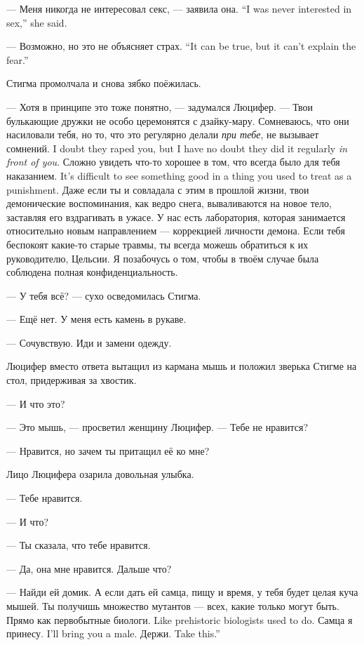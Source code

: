 {--- Меня никогда не интересовал секс, --- заявила она.}
{``I was never interested in sex,'' she said.}

{--- Возможно, но это не объясняет страх.}
{``It can be true, but it can't explain the fear.''}

Стигма промолчала и снова зябко поёжилась.

--- Хотя в принципе это тоже понятно, --- задумался Люцифер.
--- Твои булькающие дружки не особо церемонятся с дзайку-мару.
{Сомневаюсь, что они насиловали тебя, но то, что это регулярно делали \emph{при тебе}, не вызывает сомнений.}
{I doubt they raped you, but I have no doubt they did it regularly \emph{in front of you}.}
{Сложно увидеть что-то хорошее в том, что всегда было для тебя наказанием.}
{It's difficult to see something good in a thing you used to treat as a punishment.}
Даже если ты и совладала с этим в прошлой жизни, твои демонические воспоминания, как ведро снега, вываливаются на новое тело, заставляя его вздрагивать в ужасе.
У нас есть лаборатория, которая занимается относительно новым направлением --- коррекцией личности демона.
Если тебя беспокоят какие-то старые травмы, ты всегда можешь обратиться к их руководителю, Цельсии.
Я позабочусь о том, чтобы в твоём случае была соблюдена полная конфиденциальность.

--- У тебя всё? --- сухо осведомилась Стигма.

--- Ещё нет.
У меня есть камень в рукаве.

--- Сочувствую.
Иди и замени одежду.

Люцифер вместо ответа вытащил из кармана мышь и положил зверька Стигме на стол, придерживая за хвостик.

--- И что это?

--- Это мышь, --- просветил женщину Люцифер.
--- Тебе не нравится?

--- Нравится, но зачем ты притащил её ко мне?

Лицо Люцифера озарила довольная улыбка.

--- Тебе нравится.

--- И что?

--- Ты сказала, что тебе нравится.

--- Да, она мне нравится.
Дальше что?

--- Найди ей домик.
А если дать ей самца, пищу и время, у тебя будет целая куча мышей.
Ты получишь множество мутантов --- всех, какие только могут быть.
{Прямо как первобытные биологи.}
{Like prehistoric biologists used to do.}
{Самца я принесу.}
{I'll bring you a male.}
{Держи.}
{Take this.''}

